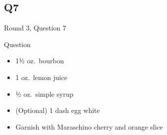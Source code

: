 \documentclass[11pt]{beamer}
\begin{document}
\subsection*{Q7}
\begin{frame}[t]{Round 3, Question 7}
\begin{block}{Question}
\begin{itemize}
\item 1½ oz.\ bourbon
\item 1 oz.\ lemon juice
\item ½ oz.\ simple syrup
\item (Optional) 1 dash egg white
\item Garnish with Maraschino cherry and orange slice
\end{itemize}
\end{block}
\end{frame}
\end{document}
